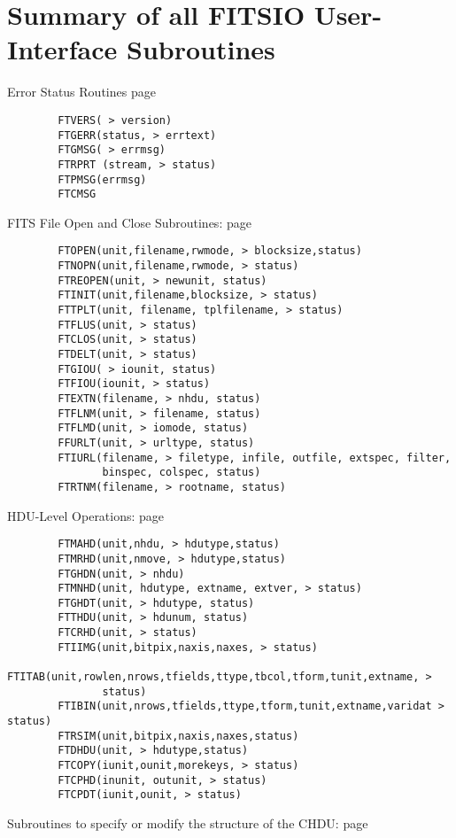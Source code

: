 \documentclass[11pt]{book}
\begin{document}
\chapter{  Summary of all FITSIO User-Interface Subroutines }

 Error Status Routines  page~\pageref{FTVERS}

\begin{verbatim}
        FTVERS( > version)
        FTGERR(status, > errtext)
        FTGMSG( > errmsg)
        FTRPRT (stream, > status)
        FTPMSG(errmsg)
        FTCMSG
\end{verbatim}
 FITS File Open and Close Subroutines: page~\pageref{FTOPEN}

\begin{verbatim}
        FTOPEN(unit,filename,rwmode, > blocksize,status)
        FTNOPN(unit,filename,rwmode, > status)
        FTREOPEN(unit, > newunit, status)
        FTINIT(unit,filename,blocksize, > status)
        FTTPLT(unit, filename, tplfilename, > status)
        FTFLUS(unit, > status)
        FTCLOS(unit, > status)
        FTDELT(unit, > status)
        FTGIOU( > iounit, status)
        FTFIOU(iounit, > status)
        FTEXTN(filename, > nhdu, status)
        FTFLNM(unit, > filename, status)
        FTFLMD(unit, > iomode, status)
        FFURLT(unit, > urltype, status)
        FTIURL(filename, > filetype, infile, outfile, extspec, filter,
               binspec, colspec, status)
        FTRTNM(filename, > rootname, status)
\end{verbatim}
 HDU-Level Operations: page~\pageref{FTMAHD}

\begin{verbatim}
        FTMAHD(unit,nhdu, > hdutype,status)
        FTMRHD(unit,nmove, > hdutype,status)
        FTGHDN(unit, > nhdu)
        FTMNHD(unit, hdutype, extname, extver, > status)
        FTGHDT(unit, > hdutype, status)
        FTTHDU(unit, > hdunum, status)
        FTCRHD(unit, > status)
        FTIIMG(unit,bitpix,naxis,naxes, > status)
        FTITAB(unit,rowlen,nrows,tfields,ttype,tbcol,tform,tunit,extname, >
               status)
        FTIBIN(unit,nrows,tfields,ttype,tform,tunit,extname,varidat > status)
        FTRSIM(unit,bitpix,naxis,naxes,status)
        FTDHDU(unit, > hdutype,status)
        FTCOPY(iunit,ounit,morekeys, > status)
        FTCPHD(inunit, outunit, > status)
        FTCPDT(iunit,ounit, > status)
\end{verbatim}
 Subroutines to specify or modify the structure of the CHDU: page~\pageref{FTRDEF}
\end{document}
